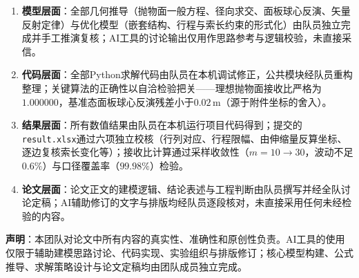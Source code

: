 \documentclass[12pt,a4paper]{article}
\begin{document}
\begin{enumerate}
    \item \textbf{模型层面}：全部几何推导（抛物面一般方程、径向求交、面板球心反演、矢量反射定律）与优化模型（嵌套结构、行程与索长约束的形式化）由队员独立完成并手工推演复核；AI工具的讨论输出仅用作思路参考与逻辑校验，未直接采信。

    \item \textbf{代码层面}：全部Python求解代码由队员在本机调试修正，公共模块经队员重构整理；关键算法的正确性以自洽检验把关——理想抛物面接收比严格为$1.000000$，基准态面板球心反演残差小于$0.02\,\mathrm{m}$（源于附件坐标的舍入）。

    \item \textbf{结果层面}：所有数值结果由队员在本机运行项目代码得到；提交的\texttt{result.xlsx}通过六项独立校核（行列对应、行程限幅、由伸缩量反算坐标、逐边复核索长变化等）；接收比计算通过采样收敛性（$m=10\to30$，波动不足$0.6\%$）与口径覆盖率（$99.98\%$）检验。

    \item \textbf{论文层面}：论文正文的建模逻辑、结论表述与工程判断由队员撰写并经全队讨论定稿；AI辅助修订的文字与排版均经队员逐段核对，未直接采用任何未经检验的内容。
\end{enumerate}

\vspace{1em}
\noindent\textbf{声明}：本团队对论文中所有内容的真实性、准确性和原创性负责。AI工具的使用仅限于辅助建模思路讨论、代码实现、实验组织与排版修订；核心模型构建、公式推导、求解策略设计与论文定稿均由团队成员独立完成。
\end{document}
